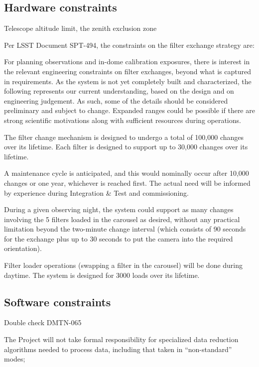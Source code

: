 \documentclass[DM,lsstdraft,toc,usenatbib]{lsstdoc}
\begin{document}
\subsection{Hardware constraints}


Telescope altitude limit, the zenith exclusion zone 


Per LSST Document SPT-494, the constraints on the filter exchange strategy are: 

For planning observations and in-dome calibration exposures, there is interest in the relevant engineering constraints on filter exchanges, beyond what is captured in requirements. As the system is not yet completely built and characterized, the following represents our current understanding, based on the design and on engineering judgement. As such, some of the details should be considered preliminary and subject to change. Expanded ranges could be possible if there are strong scientific motivations along with sufficient resources during operations.

The filter change mechanism is designed to undergo a total of 100,000 changes over its lifetime. Each filter is designed to support up to 30,000 changes over its lifetime.

A maintenance cycle is anticipated, and this would nominally occur after 10,000 changes or one year, whichever is reached first. The actual need will be informed by experience during Integration \& Test and commissioning.

During a given observing night, the system could support as many changes involving the 5 filters loaded in the carousel as desired, without any practical limitation beyond the two-minute change interval (which consists of 90 seconds for the exchange plus up to 30 seconds to put the camera into the required orientation). 

Filter loader operations (swapping a filter in the carousel) will be done during daytime. The system is designed for 3000 loads over its lifetime. 




\subsection{Software constraints} 

Double check DMTN-065

The Project will not take formal responsibility for specialized data reduction algorithms 
needed to process data, including that taken in ``non-standard'' modes; 
   
\end{document}
